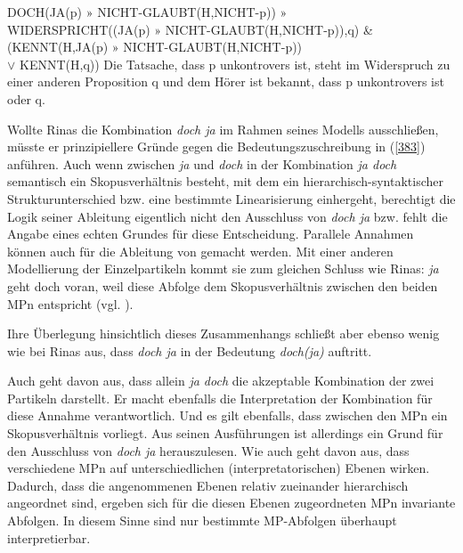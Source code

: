 \begin{exe}
	\ex\label{383} 
		\begin{xlist}	
			\ex\label{383a} DOCH(JA(p) $»$ NICHT-GLAUBT(H,NICHT-p))
				$»$ \\ WIDERSPRICHT((JA(p) $»$ NICHT-GLAUBT(H,NICHT-p)),q) \& \\
				(KENNT(H,JA(p) $»$ NICHT-GLAUBT(H,NICHT-p)) 
				\\ $\lor$ KENNT(H,q))
			\ex\label{383b} \glq Die Tatsache, dass p unkontrovers ist, steht im Widerspruch zu einer anderen Proposition q und 				dem Hörer ist bekannt, dass p unkontrovers ist oder q. \grq {}
			\hfill\hbox {\citet[431]{Rinas2007}}
		\end{xlist}
\end{exe}
Wollte Rinas die Kombination \textit{doch ja} im Rahmen seines Modells ausschließen, müsste er prinzipiellere Gründe gegen die Bedeutungszuschreibung in (\ref{383}) anführen. Auch wenn zwischen \textit{ja} und \textit{doch} in der Kombination \textit{ja doch} semantisch ein Skopusverhältnis besteht, mit dem ein hierarchisch-syntaktischer Strukturunterschied bzw. eine bestimmte Linearisierung einhergeht, berechtigt die Logik seiner Ableitung eigentlich nicht den Ausschluss von \textit{doch ja} bzw. fehlt die Angabe eines echten Grundes für diese Entscheidung. Parallele Annahmen können auch für die Ableitung von \citet{Ormelius-Sandblom1997} gemacht werden. Mit einer anderen Modellierung der Einzelpartikeln kommt sie zum gleichen Schluss wie Rinas: \textit{ja} geht doch voran, weil diese Abfolge dem Skopusverhältnis zwischen den beiden MPn entspricht (vgl. \citealt[92-93]{Ormelius-Sandblom1997}).

Ihre Überlegung hinsichtlich dieses Zusammenhangs schließt aber ebenso we\-nig wie bei Rinas aus, dass \textit{doch ja} in der Bedeutung \textit{doch(ja)} auftritt.

Auch \citet{Ickler1994} geht davon aus, dass allein \textit{ja doch} die akzeptable Kombination der zwei Partikeln darstellt. Er macht ebenfalls die Interpretation der Kombination für diese Annahme verantwortlich. Und es gilt ebenfalls, dass zwischen den MPn ein Skopusverhältnis vorliegt. Aus seinen Ausführungen ist allerdings ein Grund für den Ausschluss von \textit{doch ja} herauszulesen. Wie auch \citet{Vismans1994} geht \citet{Ickler1994} davon aus, dass verschiedene MPn auf unterschiedlichen (interpretatorischen) Ebenen wirken. Dadurch, dass die angenommenen Ebenen relativ zueinander hierarchisch angeordnet sind, ergeben sich für die diesen Ebenen zugeordneten MPn invariante Abfolgen. In diesem Sinne sind nur bestimmte MP-Abfolgen überhaupt interpretierbar.

